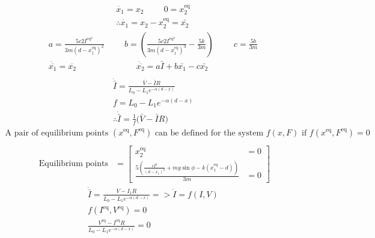     \begin{align}\nonumber
        \dot{x_1} = x_2 \hspace{1cm} 0 = x_2^\text{eq} \\ \nonumber
        \therefore \dot{x_1} = x_2 - x_2^\text{eq} = \bar{x_2}
    \end{align}
    \begin{align}\nonumber
        a = \frac{{5c}2I^\text{eq}^2}{3m(d -{x_1^\text{eq}})^2} \hspace{1cm}
        b =( \frac{5c2I^\text{eq}^2}{3m(d -{x_1^\text{eq}})^3} - \frac{5k}{3m})\hspace{1cm}
        c = \frac{5b}{3m} \\ \nonumber
        \dot{\overline{x_1}} = \overline{x_2} \hspace{3cm} \dot{\overline{x_2}} = a\bar{I} + b\bar{x_1} - c\bar{x_2} \\ \nonumber
    \end{align}
    \begin{align}\nonumber
        \dot{\bar{I}} = \frac{\bar{V} - \bar{I}R}{L_0 - L_1 e^{-\alpha(d - x)}} \\ \nonumber
        f = {L_0 - L_1 e^{-\alpha(d - x)}} \\ \nonumber
        \therefore{\dot{\bar{I}} = \frac{1}{f}(\bar{V} - \bar{I}R})
    \end{align}
    \begin{align}\nonumber
        \text{A pair of equilibrium points } ({x^\text{eq}}, {F^\text{eq}}) \text{ can be defined for the system } f(x, F) \text{ if } f({x^\text{eq}}, {F^\text{eq}}) = 0 \\ \nonumber
    \end{align}
    \begin{align}\nonumber
        \text{ Equilibrium points} &=
        \begin{bmatrix}
            {x_2^\text{eq}} &= 0
            \\
            \frac{5(\frac{c I^2}{(d - {x_1})^2} + mg \sin{\phi} - k({x_1^\text{eq}} -d))}{3m} &= 0
        \end{bmatrix}
    \end{align}
    \begin{align}\nonumber
        \dot{\bar{I}} = \frac{V - I_1R}{L_0 - L_1 e^{-\alpha(d - x)}} => \dot{I} = f(I,V) \\ \nonumber
        f(I^{\text{eq}},V^{\text{eq}}) = 0 \hspace{2cm}\\ \nonumber
        \frac{V^\text{eq} - I^\text{eq}R}{L_0 - L_1 e^{-\alpha(d - x)}} = 0 \hspace{2cm}\\ \nonumber
    \end{align}
